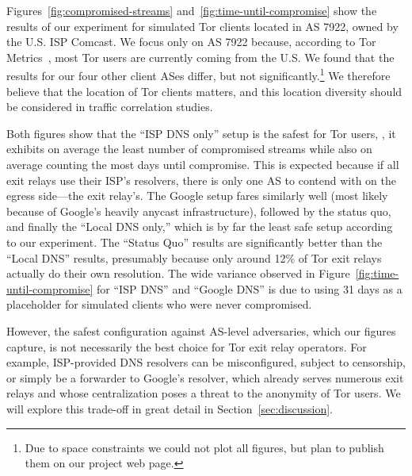 Figures~\ref{fig:compromised-streams} and~\ref{fig:time-until-compromise} show
the results of our experiment for simulated Tor clients located in AS 7922,
owned by the U.S. ISP Comcast.  We focus only on AS 7922 because, according to Tor
Metrics~\cite{metrics-countries}, most Tor users are currently coming from the
U.S.  We found that the results for our four other client ASes differ, but not
significantly.\footnote{Due to space constraints we could not plot all figures,
but plan to publish them on our project web page.}  We therefore believe that
the location of Tor clients matters, and this location diversity should be
considered in traffic correlation studies.

Both figures show that the ``ISP DNS only'' setup is the safest for Tor users,
\ie, it exhibits on average the least number of compromised streams while also
on average counting the most days until compromise.  This is expected because
if all exit relays use their ISP's resolvers, there is only one AS to contend
with on the egress side---the exit relay's.  The Google setup fares similarly
well (most likely because of Google's heavily anycast infrastructure), followed
by the status quo, and finally the ``Local DNS only,'' which is by far the
least safe setup according to our experiment.  The ``Status Quo'' results are
significantly better than the ``Local DNS'' results, presumably because only
around 12\% of Tor exit relays actually do their own resolution.  The wide
variance observed in Figure~\ref{fig:time-until-compromise} for ``ISP DNS'' and
``Google DNS'' is due to using 31 days as a placeholder for simulated clients
who were never compromised.

However, the safest configuration against AS-level adversaries, which our
figures capture, is not necessarily the best choice for Tor exit relay
operators.  For example, ISP-provided DNS resolvers can be misconfigured,
subject to censorship, or simply be a forwarder to Google's resolver, which
already serves numerous exit relays and whose centralization poses a threat to
the anonymity of Tor users.  We will explore this trade-off in great detail in
Section~\ref{sec:discussion}.
